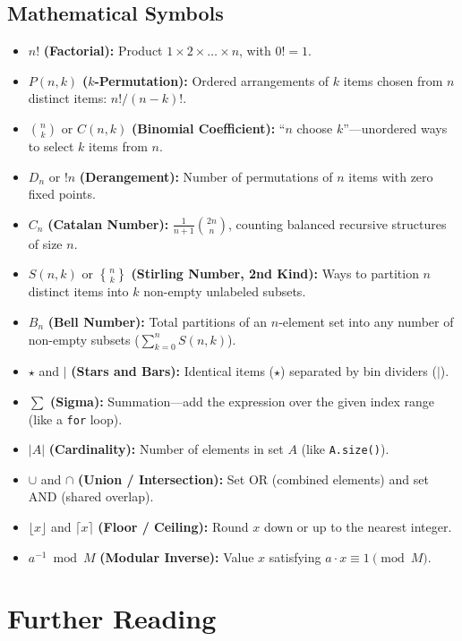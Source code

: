 \documentclass[11pt,a4paper]{article}
\theoremstyle{definition}
\begin{document}
\subsection*{Mathematical Symbols}
\begin{itemize}
    \item $n!$ \textbf{(Factorial):} Product $1 \times 2 \times \dots \times n$, with $0! = 1$.
    \item $P(n, k)$ \textbf{($k$-Permutation):} Ordered arrangements of $k$ items chosen from $n$ distinct items: $n! / (n - k)!$.
    \item $\binom{n}{k}$ or $C(n, k)$ \textbf{(Binomial Coefficient):} ``$n$ choose $k$''---unordered ways to select $k$ items from $n$.
    \item $D_n$ or $!n$ \textbf{(Derangement):} Number of permutations of $n$ items with zero fixed points.
    \item $C_n$ \textbf{(Catalan Number):} $\frac{1}{n+1}\binom{2n}{n}$, counting balanced recursive structures of size $n$.
    \item $S(n, k)$ or $\genfrac{\{}{\}}{0pt}{}{n}{k}$ \textbf{(Stirling Number, 2nd Kind):} Ways to partition $n$ distinct items into $k$ non-empty unlabeled subsets.
    \item $B_n$ \textbf{(Bell Number):} Total partitions of an $n$-element set into any number of non-empty subsets ($\sum_{k=0}^{n} S(n, k)$).
    \item $\star$ and $|$ \textbf{(Stars and Bars):} Identical items ($\star$) separated by bin dividers ($|$).
    \item $\sum$ \textbf{(Sigma):} Summation---add the expression over the given index range (like a \texttt{for} loop).
    \item $|A|$ \textbf{(Cardinality):} Number of elements in set $A$ (like \texttt{A.size()}).
    \item $\cup$ and $\cap$ \textbf{(Union / Intersection):} Set OR (combined elements) and set AND (shared overlap).
    \item $\lfloor x \rfloor$ and $\lceil x \rceil$ \textbf{(Floor / Ceiling):} Round $x$ down or up to the nearest integer.
    \item $a^{-1} \bmod M$ \textbf{(Modular Inverse):} Value $x$ satisfying $a \cdot x \equiv 1 \pmod M$.
\end{itemize}

\section{Further Reading}
\end{document}
